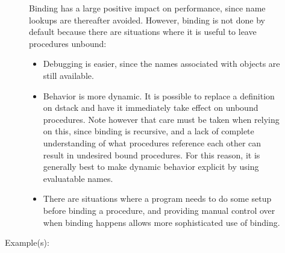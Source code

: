 \begin{description}
\begin{description}
		Binding has a large positive impact on performance, since name
		lookups are thereafter avoided.  However, binding is not done by
		default because there are situations where it is useful to leave
		procedures unbound:
		\begin{itemize}
		\item{Debugging is easier, since the names associated with
		objects are still available.}
		\item{Behavior is more dynamic.  It is possible to replace a
		definition on dstack and have it immediately take effect on
		unbound procedures.  Note however that care must be taken
		when relying on this, since binding is recursive, and a lack of
		complete understanding of what procedures reference each other
		can result in undesired bound procedures.  For this reason, it
		is generally best to make dynamic behavior explicit by using
		evaluatable names.}
		\item{There are situations where a program needs to do some
		setup before binding a procedure, and providing manual control
		over when binding happens allows more sophisticated use of
		binding.}
		\end{itemize}
	\item[Example(s): ]\begin{verbatim}


\end{verbatim}
\end{description}
\end{description}
